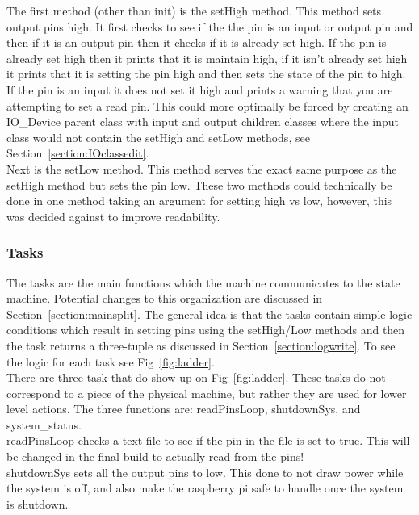 \documentclass[titlepage]{article}
\begin{document}
The first method (other than init) is the setHigh method. This method sets output pins high. It first checks to see if the the pin is an input or output pin and then if it is an output pin then it checks if it is already set high. If the pin is already set high then it prints that it is maintain high, if it isn't already set high it prints that it is setting the pin high and then sets the state of the pin to high. If the pin is an input it does not set it high and prints a warning that you are attempting to set a read pin. This could more optimally be forced by creating an IO\_Device parent class with input and output children classes where the input class would not contain the setHigh and setLow methods, see Section~\ref{section:IOclassedit}.\\

Next is the setLow method. This method serves the exact same purpose as the setHigh method but sets the pin low. These two methods could technically be done in one method taking an argument for setting high vs low, however, this was decided against to improve readability.\\

\subsubsection{Tasks}
\label{section:tasks}
The tasks are the main functions which the machine communicates to the state machine. Potential changes to this organization are discussed in Section~\ref{section:mainsplit}. The general idea is that the tasks contain simple logic conditions which result in setting pins using the setHigh/Low methods and then the task returns a three-tuple as discussed in Section~\ref{section:logwrite}. To see the logic for each task see Fig~\ref{fig:ladder}. \\

There are three task that do show up on Fig~\ref{fig:ladder}. These tasks do not correspond to a piece of the physical machine, but rather they are used for lower level actions. The three functions are: readPinsLoop, shutdownSys, and system\_status. \\

readPinsLoop checks a text file to see if the pin in the file is set to true. This will be changed in the final build to actually read from the pins!\\

shutdownSys sets all the output pins to low. This done to not draw power while the system is off, and also make the raspberry pi safe to handle once the system is shutdown.\\
\end{document}
